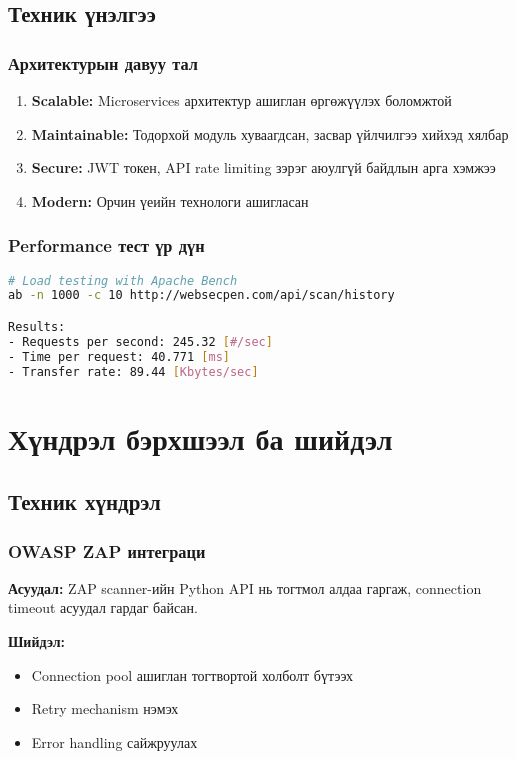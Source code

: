 \documentclass[main.tex]{subfiles}
\begin{document}
\subsection{Техник үнэлгээ}

\subsubsection{Архитектурын давуу тал}
\begin{enumerate}
    \item \textbf{Scalable:} Microservices архитектур ашиглан өргөжүүлэх боломжтой
    \item \textbf{Maintainable:} Тодорхой модуль хуваагдсан, засвар үйлчилгээ хийхэд хялбар
    \item \textbf{Secure:} JWT токен, API rate limiting зэрэг аюулгүй байдлын арга хэмжээ
    \item \textbf{Modern:} Орчин үеийн технологи ашигласан
\end{enumerate}

\subsubsection{Performance тест үр дүн}
\begin{lstlisting}[language=bash, caption=Apache Bench ашиглан load testing]
# Load testing with Apache Bench
ab -n 1000 -c 10 http://websecpen.com/api/scan/history

Results:
- Requests per second: 245.32 [#/sec]
- Time per request: 40.771 [ms]
- Transfer rate: 89.44 [Kbytes/sec]
\end{lstlisting}

\section{Хүндрэл бэрхшээл ба шийдэл}

\subsection{Техник хүндрэл}

\subsubsection{OWASP ZAP интеграци}
\textbf{Асуудал:} ZAP scanner-ийн Python API нь тогтмол алдаа гаргаж, connection timeout асуудал гардаг байсан.

\textbf{Шийдэл:}
\begin{itemize}
    \item Connection pool ашиглан тогтвортой холболт бүтээх
    \item Retry mechanism нэмэх
    \item Error handling сайжруулах
\end{itemize}
\end{document}
